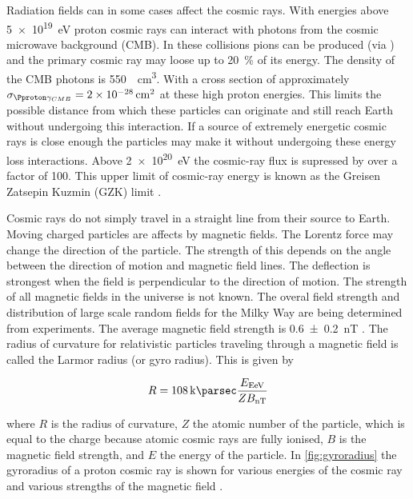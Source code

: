Radiation fields can in some cases affect the cosmic rays. With energies above \SI{5e19}{\eV} proton cosmic rays can interact with photons from the cosmic microwave background (CMB). In these collisions pions can be produced (via \PDelta) and the primary cosmic ray may loose up to \SI{20}{\percent} of its energy. The density of the CMB photons is \SI{550}{\per\centi\meter\cubed}. With a cross section of approximately $\sigma_{\Pproton \gamma_{CMB}} = \SI{2e-28}{\centi\meter\squared}$ at these high proton energies. This limits the possible distance from which these particles can originate and still reach Earth without undergoing this interaction. If a source of extremely energetic cosmic rays is close enough the particles may make it without undergoing these energy loss interactions. Above \SI{2e20}{\eV} the cosmic-ray flux is supressed by over a factor of 100. This upper limit of cosmic-ray energy is known as the Greisen Zatsepin Kuzmin (GZK) limit \cite{zatsepin1966gzk,greisen1966gzk}.

Cosmic rays do not simply travel in a straight line from their source to Earth. Moving charged particles are affects by magnetic fields. The Lorentz force may change the direction of the particle. The strength of this depends on the angle between the direction of motion and magnetic field lines. The deflection is strongest when the field is perpendicular to the direction of motion. The strength of all magnetic fields in the universe is not known. The overal field strength and distribution of large scale random fields for the Milky Way are being determined from experiments. The average magnetic field strength is \SI{0.6 \pm .2}{\nano\tesla} \cite{jansson2010magnetic}. The radius of curvature for relativistic particles traveling through a magnetic field is called the Larmor radius (or gyro radius). This is given by

\begin{equation}
    R = \SI{108}{\kilo\parsec}
        \frac{E_{\si{\exa\eV}}}{Z B_{\si{\nano\tesla}}}
\end{equation}

where $R$ is the radius of curvature, $Z$ the atomic number of the particle, which is equal to the charge because atomic cosmic rays are fully ionised, $B$ is the magnetic field strength, and $E$ the energy of the particle. In \cref{fig:gyroradius} the gyroradius of a proton cosmic ray is shown for various energies of the cosmic ray and various strengths of the magnetic field \cite{grigat2011anisotropy}.

